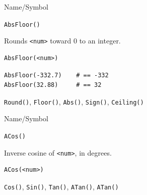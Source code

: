 \begin{desc}{Name/Symbol}

\item[Name/Symbol]  	\verb+AbsFloor()+

\item[Description]  	Rounds \verb+<num>+ toward 0 to an integer.

\item[Usage]       	
\begin{verbatim}
AbsFloor(<num>)
\end{verbatim}

\item[Example]
\begin{verbatim}
AbsFloor(-332.7)   	# == -332
AbsFloor(32.88)    	# == 32
\end{verbatim}

\item[See Also]     	\verb+Round()+, \verb+Floor()+, \verb+Abs()+, \verb+Sign()+, \verb+Ceiling()+
\end{desc}




\begin{desc}{Name/Symbol}

\item[Name/Symbol] 	\verb+ACos()+ 

\item[Description]  	Inverse cosine of \verb+<num>+, in degrees.

\item[Usage]
\begin{verbatim}
ACos(<num>)
\end{verbatim}

\item[Example]	

\item[See Also]    	\verb+Cos()+, \verb+Sin()+, \verb+Tan()+, \verb+ATan()+, \verb+ATan()+ 

\end{desc}


 


